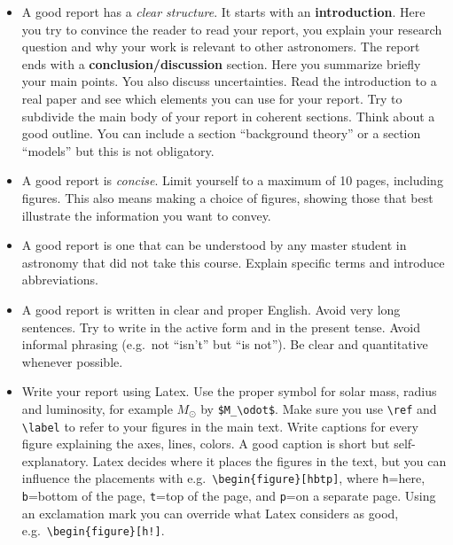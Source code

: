 \documentclass[11pt,a4paper]{article}
\begin{document}
\begin{itemize}

\item A good report has a \emph{clear structure}. It starts with an
  \textbf{introduction}. Here you try to convince the reader to read
  your report, you explain your research question and why your work is
  relevant to other astronomers.  The report ends with a
  \textbf{conclusion/discussion} section. Here you summarize briefly
  your main points. You also discuss uncertainties. Read the
  introduction to a real paper and see which elements you can use for
  your report.  Try to subdivide the main body of your report in
  coherent sections.  Think about a good outline. You can include a
  section ``background theory'' or a section ``models'' but this is
  not obligatory.

\item A good report is \emph{concise}. Limit yourself to a maximum of
  10 pages, including figures. This also means making a choice of
  figures, showing those that best illustrate the information you want
  to convey.

\item A good report is one that can be understood by any master
  student in astronomy that did not take this course. Explain specific
  terms and introduce abbreviations. 

\item A good report is written in clear and proper English. Avoid very
  long sentences. Try to write in the active form and in the present
  tense. Avoid informal phrasing (e.g.\ not ``isn't'' but ``is
  not'').  Be clear and quantitative whenever possible.

\item Write your report using Latex.  Use the proper symbol for solar
  mass, radius and luminosity, for example $M_\odot$ by
  \verb|$M_\odot$|.  Make sure you use \verb|\ref| and \verb|\label|
  to refer to your figures in the main text. Write captions for every
  figure explaining the axes, lines, colors. A good caption is short
  but self-explanatory. Latex decides where it places the figures in
  the text, but you can influence the placements with e.g.\
  \verb|\begin{figure}[hbtp]|, where \verb|h|=here, \verb|b|=bottom of
    the page, \verb|t|=top of the page, and \verb|p|=on a separate
    page. Using an exclamation mark you can override what Latex
    considers as good, e.g.\ \verb|\begin{figure}[h!]|.

\end{itemize}
\end{document}
